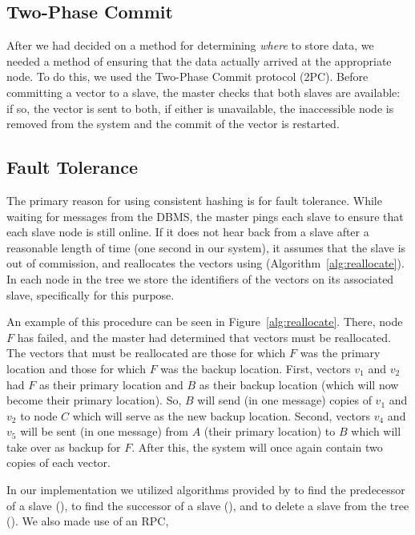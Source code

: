 \subsection{Two-Phase Commit}
After we had decided on a method for determining \emph{where} to store data,
we needed a method of ensuring that the data actually arrived at the
appropriate node. To do this, we used the Two-Phase Commit protocol (2PC).
Before committing a vector to a slave, the master checks that both slaves are
available: if so, the vector is sent to both, if either is unavailable, the
inaccessible node is removed from the system and the commit of the vector is
restarted. \cite{tanenbaum2017}
%
\subsection{Fault Tolerance}
The primary reason for using consistent hashing is for fault tolerance. While
waiting for messages from the DBMS, the master pings each slave to ensure that
each slave node is still online. If it does not hear back from a slave after a
reasonable length of time (one second in our system), it assumes that the slave
is out of commission, and reallocates the vectors using 
(Algorithm~\ref{alg:reallocate}). In each node in the tree we store the
identifiers of the vectors on its associated slave, specifically for this
purpose.
\par
An example of this procedure can be seen in Figure~\ref{alg:reallocate}. There,
node \(F\) has failed, and the master had determined that vectors must be
reallocated. The vectors that must be reallocated are those for which \(F\) was
the primary location and those for which \(F\) was the backup location. First,
vectors \(v_1\) and \(v_2\) had \(F\) as their primary location and \(B\) as
their backup location (which will now become their primary location). So, \(B\)
will send (in one message) copies of \(v_1\) and \(v_2\) to node \(C\) which
will serve as the new backup location. Second, vectors \(v_4\) and \(v_5\) will
be sent (in one message) from \(A\) (their primary location) to \(B\) which
will take over as backup for \(F\). After this, the system will once again
contain two copies of each vector.
\par
%
In our implementation we utilized algorithms provided by \cite{cormen2009}
to find the predecessor of a slave (), to find the
successor of a slave (), and to delete a slave from the
tree (). We also made use of an RPC,
